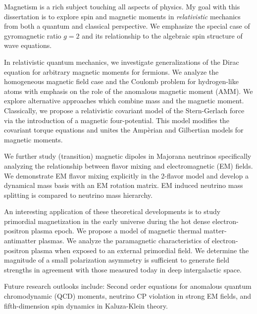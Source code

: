 

Magnetism is a rich subject touching all aspects of physics. My goal with this dissertation is to explore spin and magnetic moments in \emph{relativistic} mechanics from both a quantum and classical perspective. We emphasize the special case of gyromagnetic ratio $g\!=\!2$ and its relationship to the algebraic spin structure of wave equations.

In relativistic quantum mechanics, we investigate generalizations of the Dirac equation for arbitrary magnetic moments for fermions. We analyze the homogeneous magnetic field case and the Coulomb problem for hydrogen-like atoms with emphasis on the role of the anomalous magnetic moment (AMM). We explore alternative approaches which combine mass and the magnetic moment. Classically, we propose a relativistic covariant model of the Stern-Gerlach force via the introduction of a magnetic four-potential. This model modifies the covariant torque equations and unites the Amp{\`e}rian and Gilbertian models for magnetic moments.

We further study (transition) magnetic dipoles in Majorana neutrinos specifically analyzing the relationship between flavor mixing and electromagnetic (EM) fields. We demonstrate EM flavor mixing explicitly in the 2-flavor model and develop a dynamical mass basis with an EM rotation matrix. EM induced neutrino mass splitting is compared to neutrino mass hierarchy.

An interesting application of these theoretical developments is to study primordial magnetization in the early universe during the hot dense electron-positron plasma epoch. We propose a model of magnetic thermal matter-antimatter plasmas. We analyze the paramagnetic characteristics of electron-positron plasma when exposed to an external primordial field. We determine the magnitude of a small polarization asymmetry is sufficient to generate field strengths in agreement with those measured today in deep intergalactic space.

Future research outlooks include: Second order equations for anomalous quantum chromodynamic (QCD) moments, neutrino CP violation in strong EM fields, and fifth-dimension spin dynamics in Kaluza-Klein theory.
